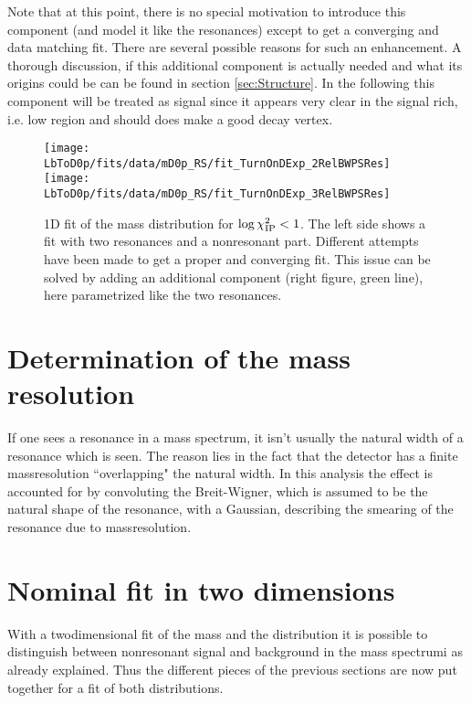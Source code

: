 Note that at this point, there is no special motivation to introduce this component (and model it like the resonances) except to get a converging and data matching fit.
There are several possible reasons for such an enhancement.
A thorough discussion, if this additional component is actually needed and what its origins could be can be found in section \ref{sec:Structure}.
In the following this component will be treated as signal since it appears very clear in the signal rich, i.e. low \logIP region and should does make a good decay vertex.
\begin{figure}[hptb]
    \centering
	\texttt{[image: LbToD0p/fits/data/mD0p\_RS/fit\_TurnOnDExp\_2RelBWPSRes]}
	\texttt{[image: LbToD0p/fits/data/mD0p\_RS/fit\_TurnOnDExp\_3RelBWPSRes]}
	\caption{1D fit of the \Dz\proton mass distribution for $\log \chi^2_{\text{IP}} < 1$. The left side shows a fit with two resonances and a nonresonant part. Different attempts have been made to get a proper and converging fit. This issue can be solved by adding an additional component (right figure, green line), here parametrized like the two resonances.}
    \label{fig:fit_mD0p_RS}
\end{figure}



\section{Determination of the mass resolution}
\label{sec:Massresolution}
If one sees a resonance in a mass spectrum, it isn't usually the natural width of a resonance which is seen.
The reason lies in the fact that the detector has a finite massresolution ``overlapping" the natural width.
In this analysis the effect is accounted for by convoluting the Breit-Wigner, which is assumed to be the natural shape of the resonance, with a Gaussian, describing the smearing of the resonance due to massresolution.


\section{Nominal fit in two dimensions}
\label{sec:Fit_2D}
With a twodimensional fit of the \Dz\proton mass and the \logIP distribution it is possible to distinguish between nonresonant signal and background in the \Dz\proton mass spectrumi as already explained.
Thus the different pieces of the previous sections are now put together for a fit of both distributions.

